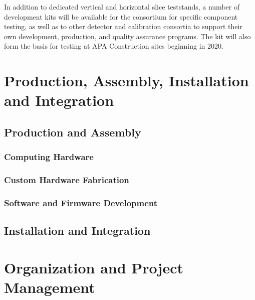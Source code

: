 In addition to dedicated vertical and horizontal slice teststands, a number of
 development kits will be available for the consortium for
specific component testing, as well as to other detector and
calibration consortia to support their own development, production, and quality assurance programs. The  
kit will also form the basis for testing at APA Construction sites beginning in 2020. 

\section{Production, Assembly, Installation and Integration}
\label{sec:sp-daq:production}


\subsection{Production and Assembly}

\subsubsection{Computing Hardware}

\subsubsection{Custom Hardware Fabrication}

\subsubsection{Software and Firmware Development}

\subsection{Installation and Integration}


\section{Organization and Project Management}
\label{sec:sp-daq:organization}


